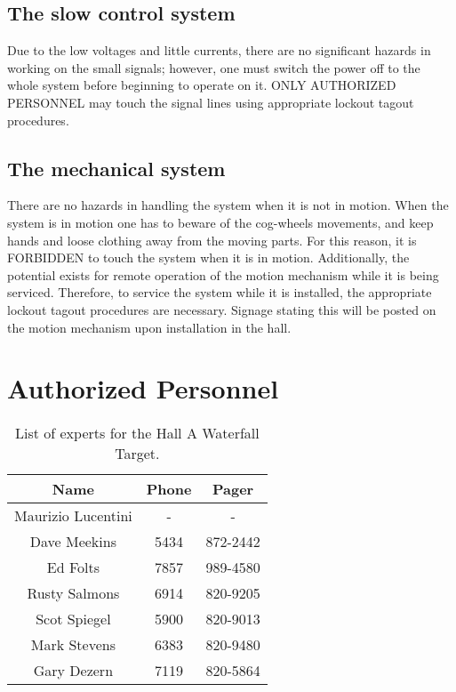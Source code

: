 \begin{safetyen}{10}{10}
\subsection{The slow control system}
\end{safetyen}

Due to the low voltages and little currents, there are no significant
hazards in working on the small signals; however, one must switch
the power off to the whole system before beginning to operate on it.
ONLY AUTHORIZED PERSONNEL may touch the signal lines using appropriate
lockout tagout procedures.


\begin{safetyen}{10}{10}
\subsection{The mechanical system}
\end{safetyen}

There are no hazards in handling the system when it is not in motion.
When the system is in motion one has to beware of the cog-wheels movements,
and keep hands and loose clothing away from the moving parts. For
this reason, it is FORBIDDEN to touch the system when it is in motion.
Additionally, the potential exists for remote operation of the motion
mechanism while it is being serviced. Therefore, to service the system
while it is installed, the appropriate lockout tagout procedures are
necessary. Signage stating this will be posted on the motion mechanism
upon installation in the hall.

\newpage
\section{Authorized  Personnel}

\begin{table}[htp]
\begin{center}
  \begin{tabular}{|c|c|c|}\hline 
  Name             & Phone & Pager\\ \hline\hline 
Maurizio Lucentini &   -   & -\\ \hline
Dave Meekins       & 5434  & 872-2442\\ \hline
Ed Folts           & 7857  & 989-4580\\ \hline
Rusty Salmons      & 6914  & 820-9205\\ \hline
Scot Spiegel       & 5900  & 820-9013\\ \hline
Mark Stevens       & 6383  & 820-9480\\\hline
Gary Dezern        & 7119  & 820-5864\\\hline
\end{tabular}
\end{center}
\caption{List of experts for the Hall A Waterfall Target.\label{tab:wt_experts}}
\end{table}

